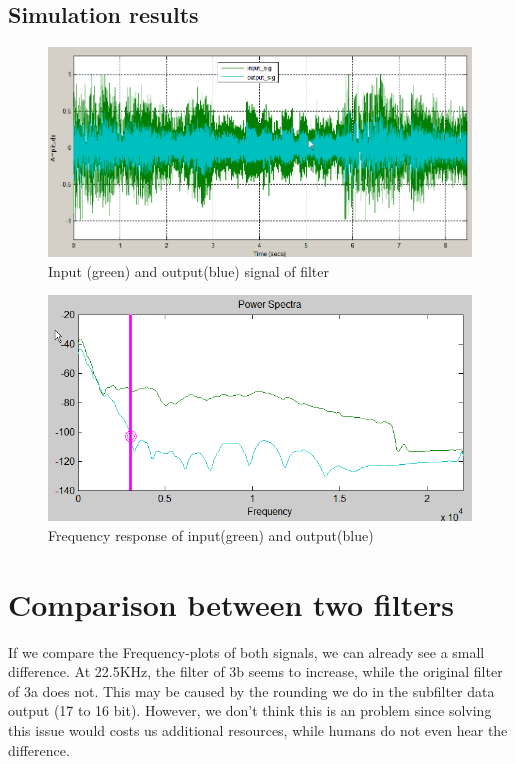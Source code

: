 \documentclass[a4paper,twoside,11pt, fleqn]{article}
\begin{document}
\subsection{Simulation results}
\begin{figure}[h]
	\includegraphics[scale = 0.71]{Images/3b_timedomain_inputoutput}
    \caption{Input (green) and output(blue) signal of filter}
\end{figure}

\begin{figure}[h]
	\includegraphics[scale = 0.92]{Images/3b_powerspectra}
    \caption{Frequency response of input(green) and output(blue)}
\end{figure}


\newpage
\section{Comparison between two filters}
If we compare the Frequency-plots of both signals, we can already see a small difference. At 22.5KHz, the filter of 3b seems to increase, while the original filter of 3a does not. This may be caused by the rounding we do in the subfilter data output (17 to 16 bit). However, we don't think this is an problem since solving this issue would costs us additional resources, while humans do not even hear the difference.
\end{document}
